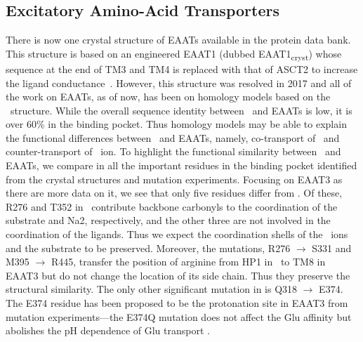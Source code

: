 \subsection{Excitatory Amino-Acid Transporters}
There is now one crystal structure of EAATs available in the protein data bank. 
This structure is based on an engineered EAAT1 (dubbed EAAT1\textsubscript{cryst}) 
whose sequence at the end of TM3 and TM4 is replaced with that of ASCT2 to increase 
the ligand conductance~\cite{Canul-Tec2017}. However, this structure was resolved in 
2017 and all of the work on EAATs, as of now, has been on homology models based on 
the \GltPh\ structure. While the overall sequence identity between \GltPh\ and EAATs 
is low, it is over 60\% in the binding pocket. Thus homology models may be able to 
explain the functional differences between \GltPh\ and EAATs, namely, co-transport 
of \Hi\ and counter-transport of \K\ ion. To highlight the functional similarity 
between \GltPh\ and EAATs, we compare in  all the important 
residues in the binding pocket identified from the crystal structures and mutation 
experiments. Focusing on EAAT3 as there are more data on it, we see that only five 
residues differ from \GltPh. Of these, R276 and T352 in \GltPh\ contribute backbone 
carbonyls to the coordination of the substrate and Na2, respectively, and the other 
three are not involved in the coordination of the ligands. Thus we expect the 
coordination shells of the \Na\ ions and the substrate to be preserved. Moreover, the 
mutations, R276 $\to$ S331 and M395 $\to$ R445, transfer the position of arginine 
from HP1 in \GltPh\ to TM8 in EAAT3 but do not change the location of its side chain. 
Thus they preserve the structural similarity. The only other significant mutation 
in  is Q318 $\to$ E374. The E374 residue has been proposed to be 
the protonation site in EAAT3 from mutation experiments---the E374Q mutation does 
not affect the Glu affinity but abolishes the pH dependence of Glu transport 
\cite{Watzke2000,Grewer2003b}.

